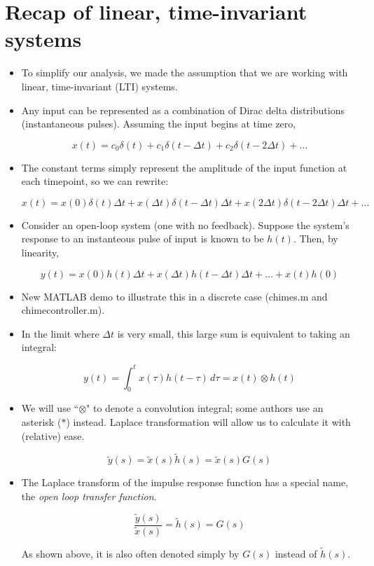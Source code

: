 \documentclass{article}
\begin{document}
\large

\section*{Recap of linear, time-invariant systems}

\begin{itemize}
\item To simplify our analysis, we made the assumption that we are working with linear, time-invariant (LTI) systems.
\item Any input can be represented as a combination of Dirac delta distributions (instantaneous pulses). Assuming the input begins at time zero,

\[  x(t) = c_0 \delta(t) + c_1 \delta(t - \Delta t) + c_2 \delta(t - 2 \Delta t) + \ldots  \]

\item The constant terms simply represent the amplitude of the input function at each timepoint, so we can rewrite:

\[  x(t) = x(0) \delta(t) \Delta t + x(\Delta t) \delta(t - \Delta t) \Delta t + x(2\Delta t) \delta(t - 2 \Delta t) \Delta t + \ldots  \]

\item Consider an open-loop system (one with no feedback). Suppose the system's response to an instanteous pulse of input is known to be $h(t)$. Then, by linearity,

\[ y(t) = x(0) h(t) \Delta t + x(\Delta t) h(t - \Delta t) \Delta t  + \ldots + x(t) h(0) \] 

\item New MATLAB demo to illustrate this in a discrete case (chimes.m and chimecontroller.m).
\item In the limit where $\Delta t$  is very small, this large sum is equivalent to taking an integral:

\[ y(t) = \int_0^t x(\tau) h(t-\tau)\, d \tau =x(t) \otimes h(t) \]
\item We will use ``$\otimes$" to denote a convolution integral; some authors use an asterisk ($*$) instead. Laplace transformation will allow us to calculate it with (relative) ease.

\[ \tilde{y}(s) = \tilde{x}(s)\tilde{h}(s) = \tilde{x}(s) G(s) \]

\item The Laplace transform of the impulse response function has a special name, the \textit{open loop transfer function}.

\[ \frac{\tilde{y}(s)}{\tilde{x}(s)} = \tilde{h}(s) = G(s) \]

As shown above, it is also often denoted simply by $G(s)$ instead of $\tilde{h}(s)$.
\end{itemize}
\end{document}
